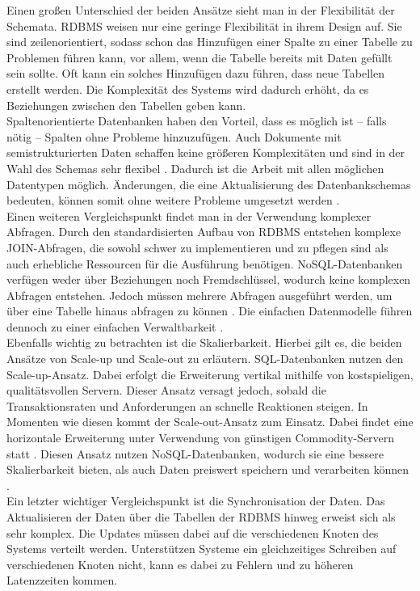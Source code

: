 Einen großen Unterschied der beiden Ansätze sieht man in der Flexibilität der Schemata. RDBMS weisen nur eine geringe Flexibilität in ihrem Design auf. Sie sind zeilenorientiert, sodass schon das Hinzufügen einer Spalte zu einer Tabelle zu Problemen führen kann, vor allem, wenn die Tabelle bereits mit Daten gefüllt sein sollte. Oft kann ein solches Hinzufügen dazu führen, dass neue Tabellen erstellt werden. Die Komplexität des Systems wird dadurch erhöht, da es Beziehungen zwischen den Tabellen geben kann.\\
Spaltenorientierte Datenbanken haben den Vorteil, dass es möglich ist – falls nötig – Spalten ohne Probleme hinzuzufügen. Auch Dokumente mit semistrukturierten Daten schaffen keine größeren Komplexitäten und sind in der Wahl des Schemas sehr flexibel \cite[S.19]{zwei}. Dadurch ist die Arbeit mit allen möglichen Datentypen möglich. Änderungen, die eine Aktualisierung des Datenbankschemas bedeuten, können somit ohne weitere Probleme umgesetzt werden \cite[S.18]{zwei}. \\
Einen weiteren Vergleichspunkt findet man in der Verwendung komplexer Abfragen. Durch den standardisierten Aufbau von RDBMS entstehen komplexe JOIN-Abfragen, die sowohl schwer zu implementieren und zu pflegen sind als auch erhebliche Ressourcen für die Ausführung benötigen. NoSQL-Datenbanken verfügen weder über Beziehungen noch Fremdschlüssel, wodurch keine komplexen Abfragen entstehen. Jedoch müssen mehrere Abfragen ausgeführt werden, um über eine Tabelle hinaus abfragen zu können \cite[S19f.]{zwei}. Die einfachen Datenmodelle führen dennoch zu einer einfachen Verwaltbarkeit \cite[S.18]{zwei}.\\ 
Ebenfalls wichtig zu betrachten ist die Skalierbarkeit. Hierbei gilt es, die beiden Ansätze von Scale-up und Scale-out zu erläutern. SQL-Datenbanken nutzen den Scale-up-Ansatz. Dabei erfolgt die Erweiterung vertikal mithilfe von kostspieligen, qualitätsvollen Servern. Dieser Ansatz versagt jedoch, sobald die Transaktionsraten und Anforderungen an schnelle Reaktionen steigen. In Momenten wie diesen kommt der Scale-out-Ansatz zum Einsatz. Dabei findet eine horizontale Erweiterung unter Verwendung von günstigen Commodity-Servern statt \cite[S.18]{zwei}. Diesen Ansatz nutzen NoSQL-Datenbanken, wodurch sie eine bessere Skalierbarkeit bieten, als auch Daten preiswert speichern und verarbeiten können \cite[S.19f.]{zwei}.\\
Ein letzter wichtiger Vergleichspunkt ist die Synchronisation der Daten. Das Aktualisieren der Daten über die Tabellen der RDBMS hinweg erweist sich als sehr komplex. Die Updates müssen dabei auf die verschiedenen Knoten des Systems verteilt werden. Unterstützen Systeme ein gleichzeitiges Schreiben auf verschiedenen Knoten nicht, kann es dabei zu Fehlern und zu höheren Latenzzeiten kommen. \\
